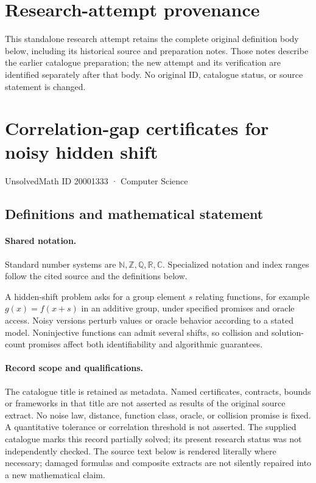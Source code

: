 \documentclass[11pt]{article}
\begin{document}
\section*{Research-attempt provenance}
This standalone research attempt retains the complete original definition body below,
including its historical source and preparation notes. Those notes describe the
earlier catalogue preparation; the new attempt and its verification are identified
separately after that body. No original ID, catalogue status, or source statement is changed.

\section{Correlation-gap certificates for noisy hidden shift}\label{20001333}
{\small UnsolvedMath ID 20001333 · Computer Science}
\subsection{Definitions and mathematical statement}

\paragraph{Shared notation.}Standard number systems are $\mathbb N,\mathbb Z,\mathbb Q,\mathbb R,\mathbb C$. Specialized notation and index ranges follow the cited source and the definitions below.


A hidden-shift problem asks for a group element $s$ relating functions, for example $g(x)=f(x+s)$ in an additive group, under specified promises and oracle access. Noisy versions perturb values or oracle behavior according to a stated model. Noninjective functions can admit several shifts, so collision and solution-count promises affect both identifiability and algorithmic guarantees.
\paragraph{Record scope and qualifications.}
The catalogue title is retained as metadata. Named certificates, contracts, bounds or frameworks in that title are not asserted as results of the original source extract.
No noise law, distance, function class, oracle, or collision promise is fixed. A quantitative tolerance or correlation threshold is not asserted. The supplied catalogue marks this record partially solved; its present research status was not independently checked.
The source text below is rendered literally where necessary; damaged formulas and composite extracts are not silently repaired into a new mathematical claim.
\end{document}
